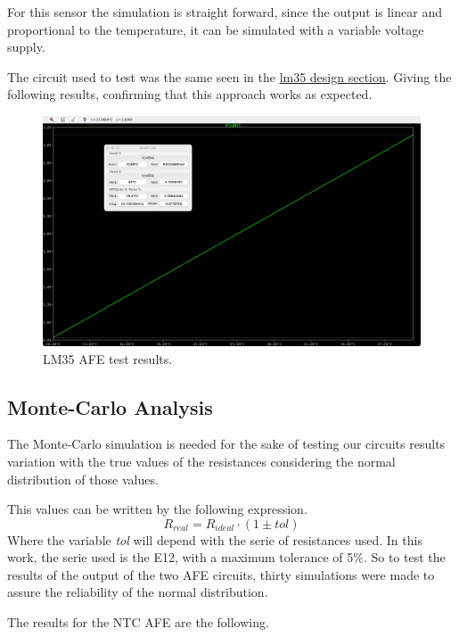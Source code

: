 \documentclass[12pt]{article}
\begin{document}
    For this sensor the simulation is straight forward, since the output is linear and proportional to the temperature, 
    it can be simulated with a variable voltage supply. 
    
    The circuit used to test was the same seen in the \hyperref[AFELM35]{lm35 design section}.
    Giving the following results, confirming that this approach works as expected. 
    
    \begin{figure}[H] 
        \centering
        \includegraphics*[scale = 0.15]{images/LM35AFERes.jpeg}
        \caption{LM35 AFE test results.}
        \label{wrap-fig:1}
    \end{figure}

\subsection{Monte-Carlo Analysis} 
    
    The Monte-Carlo simulation is needed for the sake of testing our circuits results variation with the true values of the resistances considering 
    the normal distribution of those values. 

    This values can be written by the following expression.
    \begin{equation}
        R_{real} = R_{ideal} \cdot (1 \pm tol)
    \end{equation}
    Where the variable \textit{tol} will depend with the serie of resistances used. 
    In this work, the serie used is the E12, with a maximum tolerance of 5\%. So to test the results of
    the output of the two AFE circuits, thirty simulations were made to assure the reliability of the normal distribution.

    The results for the NTC AFE are the following.
\end{document}
